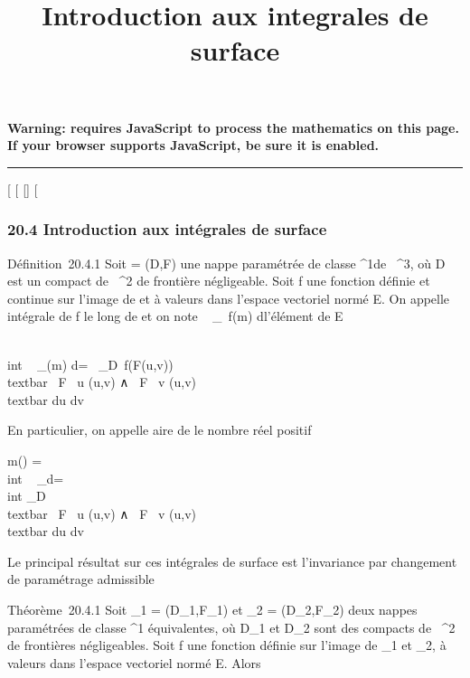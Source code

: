\documentclass[]{article}
\title{Introduction aux integrales de surface}
\author{}
\date{}
\begin{document}
\maketitle

\textbf{Warning: 
requires JavaScript to process the mathematics on this page.\\ If your
browser supports JavaScript, be sure it is enabled.}

\begin{center}\rule{3in}{0.4pt}\end{center}

{[}
{[}
{[}{]}
{[}

\subsubsection{20.4 Introduction aux intégrales de surface}

Définition~20.4.1 Soit \Sigma = (D,F) une nappe paramétrée de classe
^1de ~^3, où D est un compact de ~^2
de frontière négligeable. Soit f une fonction définie et continue sur
l'image de \Sigma et à valeurs dans l'espace vectoriel normé E. On appelle
intégrale de f le long de \Sigma et on note \int ~
\int  \_\Sigma~f(m) d\sigma l'élément de E

\int  \\int ~
\_\Sigmaf(m) d\sigma =\int ~
\int  \_D~f(F(u,v))
\\textbar{} \partial~F \over \partial~u (u,v) ∧ \partial~F
\over \partial~v (u,v)\\textbar{} du dv

En particulier, on appelle aire de \Sigma le nombre réel positif

m(\Sigma) =\int  \\int ~
\_\Sigma d\sigma =\int ~ \\int
 \_D\\textbar{} \partial~F \over \partial~u
(u,v) ∧ \partial~F \over \partial~v (u,v)\\textbar{}
du dv

Le principal résultat sur ces intégrales de surface est l'invariance par
changement de paramétrage admissible

Théorème~20.4.1 Soit \Sigma\_1 = (D\_1,F\_1) et
\Sigma\_2 = (D\_2,F\_2) deux nappes paramétrées de
classe ^1 équivalentes, où D\_1 et D\_2 sont
des compacts de ~^2 de frontières négligeables. Soit f une
fonction définie sur l'image de \Sigma\_1 et \Sigma\_2, à valeurs
dans l'espace vectoriel normé E. Alors
\end{document}
